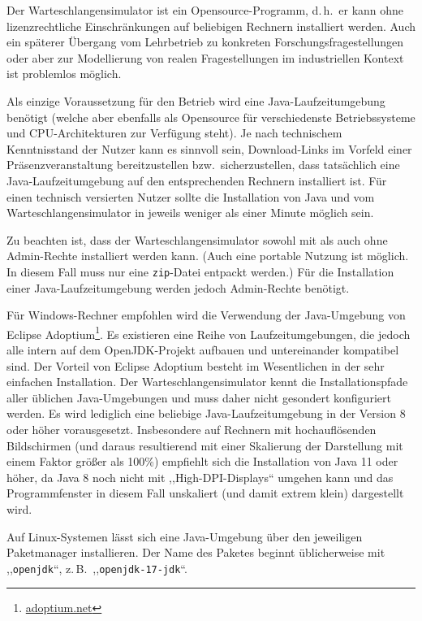 \documentclass[deutsch]{svmono}
\begin{document}
Der Warteschlangensimulator ist ein Opensource-Programm, d.\,h.\ er kann ohne lizenzrechtliche Einschränkungen auf beliebigen Rechnern installiert werden. Auch ein späterer Übergang vom Lehrbetrieb zu konkreten Forschungsfragestellungen oder aber zur Modellierung von realen Fragestellungen im industriellen Kontext ist problemlos möglich.

Als einzige Voraussetzung für den Betrieb wird eine Java-Laufzeitumgebung benötigt (welche aber ebenfalls als Opensource für verschiedenste Betriebssysteme und CPU-Architekturen zur Verfügung steht). Je nach technischem Kenntnisstand der Nutzer kann es sinnvoll sein, Download-Links im Vorfeld einer Präsenzveranstaltung bereitzustellen bzw.\ sicherzustellen, dass tatsächlich eine Java-Laufzeitumgebung auf den entsprechenden Rechnern installiert ist. Für einen technisch versierten Nutzer sollte die Installation von Java und vom Warteschlangensimulator in jeweils weniger als einer Minute möglich sein.

Zu beachten ist, dass der Warteschlangensimulator sowohl mit als auch ohne Admin-Rechte installiert werden kann. (Auch eine portable Nutzung ist möglich. In diesem Fall muss nur eine \texttt{zip}-Datei entpackt werden.) Für die Installation einer Java-Laufzeitumgebung werden jedoch Admin-Rechte benötigt.

Für Windows-Rechner empfohlen wird die Verwendung der Java-Umgebung von Eclipse Adoptium\footnote{\href{https://adoptium.net/}{adoptium.net}}. Es existieren eine Reihe von Laufzeitumgebungen, die jedoch alle intern auf dem OpenJDK-Projekt aufbauen und untereinander kompatibel sind. Der Vorteil von Eclipse Adoptium besteht im Wesentlichen in der sehr einfachen Installation. Der Warteschlangensimulator kennt die Installationspfade aller üblichen Java-Umgebungen und muss daher nicht gesondert konfiguriert werden. Es wird lediglich eine beliebige Java-Laufzeitumgebung in der Version 8 oder höher vorausgesetzt. Insbesondere auf Rechnern mit hochauflösenden Bildschirmen (und daraus resultierend mit einer Skalierung der Darstellung mit einem Faktor größer als 100\%) empfiehlt sich die Installation von Java 11 oder höher, da Java 8 noch nicht mit ,,High-DPI-Displays`` umgehen kann und das Programmfenster in diesem Fall unskaliert (und damit extrem klein) dargestellt wird.

Auf Linux-Systemen lässt sich eine Java-Umgebung über den jeweiligen Paketmanager installieren. Der Name des Paketes beginnt üblicherweise mit ,,\texttt{openjdk}``, z.\,B.\ ,,\texttt{openjdk-17-jdk}``.
\end{document}
